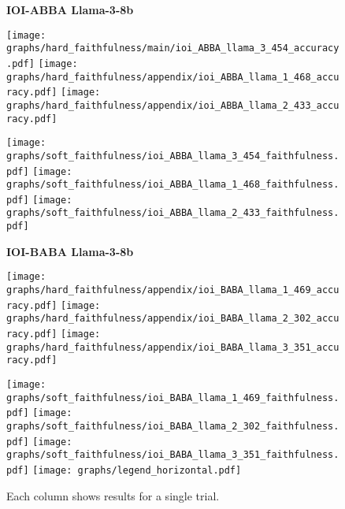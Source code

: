 \begin{figure*}
    \centering
    \textbf{IOI-ABBA Llama-3-8b}


    \texttt{[image: graphs/hard\_faithfulness/main/ioi\_ABBA\_llama\_3\_454\_accuracy.pdf]} \hfill 
    \texttt{[image: graphs/hard\_faithfulness/appendix/ioi\_ABBA\_llama\_1\_468\_accuracy.pdf]} \hfill 
    \texttt{[image: graphs/hard\_faithfulness/appendix/ioi\_ABBA\_llama\_2\_433\_accuracy.pdf]} \hfill 

    
    \vspace{0.05cm}
    \texttt{[image: graphs/soft\_faithfulness/ioi\_ABBA\_llama\_3\_454\_faithfulness.pdf]} \hfill 
    \texttt{[image: graphs/soft\_faithfulness/ioi\_ABBA\_llama\_1\_468\_faithfulness.pdf]} \hfill 
    \texttt{[image: graphs/soft\_faithfulness/ioi\_ABBA\_llama\_2\_433\_faithfulness.pdf]} \hfill 


     \textbf{IOI-BABA Llama-3-8b}


    \texttt{[image: graphs/hard\_faithfulness/appendix/ioi\_BABA\_llama\_1\_469\_accuracy.pdf]} \hfill 
    \texttt{[image: graphs/hard\_faithfulness/appendix/ioi\_BABA\_llama\_2\_302\_accuracy.pdf]} \hfill 
    \texttt{[image: graphs/hard\_faithfulness/appendix/ioi\_BABA\_llama\_3\_351\_accuracy.pdf]} \hfill 

    
    \vspace{0.05cm}
    \texttt{[image: graphs/soft\_faithfulness/ioi\_BABA\_llama\_1\_469\_faithfulness.pdf]} \hfill 
    \texttt{[image: graphs/soft\_faithfulness/ioi\_BABA\_llama\_2\_302\_faithfulness.pdf]} \hfill 
    \texttt{[image: graphs/soft\_faithfulness/ioi\_BABA\_llama\_3\_351\_faithfulness.pdf]} \hfill 
    \vspace{0.05cm}
    \texttt{[image: graphs/legend\_horizontal.pdf]} \hfill
\caption{Each column shows results for a single trial.}
\label{fig:faithfulness_all_ioi_llama}
\end{figure*}


